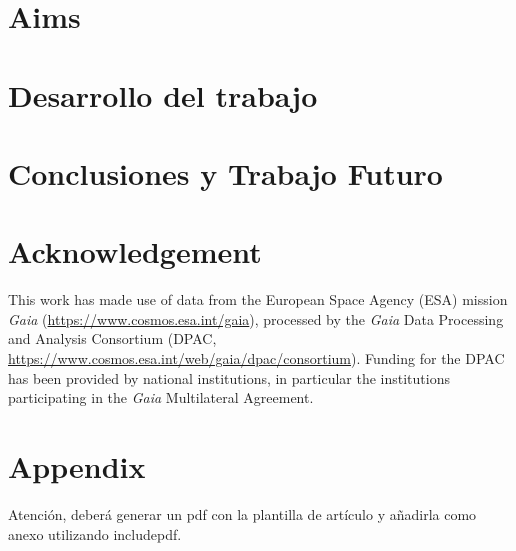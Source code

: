 \documentclass[11pt, a4paper, english]{book}
\begin{document}
\chapter{Aims}

\chapter{Desarrollo del trabajo}

\chapter{Conclusiones y Trabajo Futuro}

\chapter*{Acknowledgement}

This work has made use of data from the European Space Agency (ESA) mission
{\it Gaia} (\url{https://www.cosmos.esa.int/gaia}), processed by the {\it Gaia}
Data Processing and Analysis Consortium (DPAC,
\url{https://www.cosmos.esa.int/web/gaia/dpac/consortium}). Funding for the DPAC
has been provided by national institutions, in particular the institutions
participating in the {\it Gaia} Multilateral Agreement.




\appendix
\chapter{Appendix}
Atención, deberá generar un pdf con la plantilla de artículo y añadirla como anexo utilizando includepdf.

\end{document}
